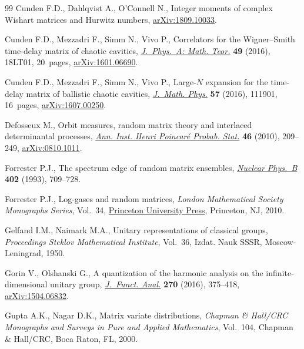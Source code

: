\documentclass[pdftex]{sigma}
\numberwithin{equation}{section}
\begin{document}
\begin{thebibliography}{99}
Cunden F.D., Dahlqvist A., O'Connell N., Integer moments of complex Wishart
 matrices and Hurwitz numbers, \href{https://arxiv.org/abs/1809.10033}{arXiv:1809.10033}.

Cunden F.D., Mezzadri F., Simm N., Vivo P., Correlators for the
 {W}igner--{S}mith time-delay matrix of chaotic cavities, \href{https://doi.org/10.1088/1751-8113/49/18/18LT01}{\textit{J.~Phys.~A:
 Math. Teor.}} \textbf{49} (2016), 18LT01, 20~pages, \href{https://arxiv.org/abs/1601.06690}{arXiv:1601.06690}.

Cunden F.D., Mezzadri F., Simm N., Vivo P., Large-{$N$} expansion for the
 time-delay matrix of ballistic chaotic cavities, \href{https://doi.org/10.1063/1.4966642}{\textit{J.~Math. Phys.}}
 \textbf{57} (2016), 111901, 16~pages, \href{https://arxiv.org/abs/1607.00250}{arXiv:1607.00250}.

Defosseux M., Orbit measures, random matrix theory and interlaced determinantal
 processes, \href{https://doi.org/10.1214/09-AIHP314}{\textit{Ann. Inst. Henri Poincar\'{e} Probab. Stat.}} \textbf{46}
 (2010), 209--249, \href{https://arxiv.org/abs/0810.1011}{arXiv:0810.1011}.

Forrester P.J., The spectrum edge of random matrix ensembles, \href{https://doi.org/10.1016/0550-3213(93)90126-A}{\textit{Nuclear
 Phys.~B}} \textbf{402} (1993), 709--728.

Forrester P.J., Log-gases and random matrices, \textit{London Mathematical
 Society Monographs Series}, Vol.~34, \href{https://doi.org/10.1515/9781400835416}{Princeton University Press}, Princeton,
 NJ, 2010.

Gelfand I.M., Naimark M.A., Unitary representations of classical groups,
 \textit{Proceedings Steklov Mathematical Institute}, Vol.~36, Izdat. Nauk
 SSSR, Moscow-Leningrad, 1950.

Gorin V., Olshanski G., A quantization of the harmonic analysis on the
 infinite-dimensional unitary group, \href{https://doi.org/10.1016/j.jfa.2015.06.006}{\textit{J.~Funct. Anal.}} \textbf{270}
 (2016), 375--418, \href{https://arxiv.org/abs/1504.06832}{arXiv:1504.06832}.

Gupta A.K., Nagar D.K., Matrix variate distributions, \textit{Chapman \&
 Hall/CRC Monographs and Surveys in Pure and Applied Mathematics}, Vol.~104,
 Chapman \& Hall/CRC, Boca Raton, FL, 2000.


\end{thebibliography}
\end{document}
